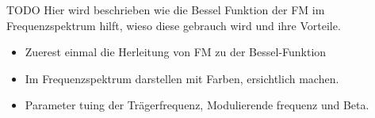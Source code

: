 TODO
Hier wird beschrieben wie die Bessel Funktion der FM im Frequenzspektrum hilft, wieso diese gebrauch wird und ihre Vorteile.
\begin{itemize}
    \item Zuerest einmal die Herleitung von FM zu der Bessel-Funktion
    \item Im Frequenzspektrum darstellen mit Farben, ersichtlich machen. 
    \item Parameter tuing der Trägerfrequenz, Modulierende frequenz und Beta. 
\end{itemize}
\newpage





